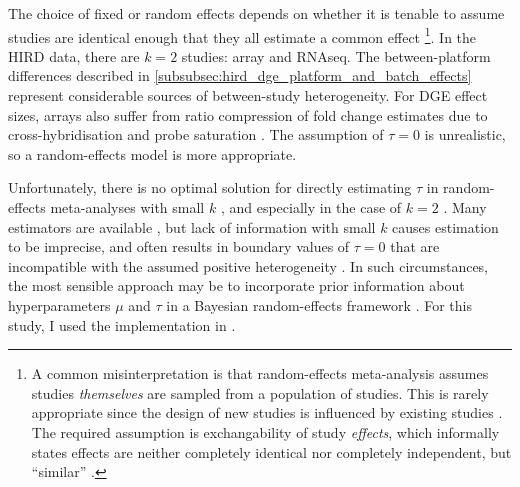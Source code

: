 The choice of fixed or random effects depends on whether it is tenable to assume studies are identical enough that they all estimate a common effect%
\footnote{
    A common misinterpretation is that random-effects meta-analysis assumes studies \emph{themselves} are sampled from a population of studies.
    This is rarely appropriate since the design of new studies is influenced by existing studies \autocite{higgins2009ReevaluationRandomeffectsMetaanalysis}.
    The required assumption is exchangability of study \emph{effects}, which informally states
    effects are neither completely identical nor completely independent, but \enquote{similar} \autocite{higgins2009ReevaluationRandomeffectsMetaanalysis}.
}.
In the \gls{HIRD} data, there are $k=2$ studies: array and \gls{RNAseq}.
The between-platform differences described in \cref{subsubsec:hird_dge_platform_and_batch_effects} represent considerable sources of between-study heterogeneity.
For \gls{DGE} effect sizes, arrays also suffer from ratio compression of fold change estimates due to cross-hybridisation and probe saturation \autocite{yuen2002AccuracyCalibrationCommercial,draghici2006ReliabilityReproducibilityIssues,ma2017JointBayesianModel}.
The assumption of $\tau=0$ is unrealistic, so a random-effects model is more appropriate.

Unfortunately, there is no optimal solution for directly estimating $\tau$ in random-effects meta-analyses with small $k$ \autocite{bender2018MethodsEvidenceSynthesis}, and especially in the case of $k=2$ \autocite{gonnermann2015NoSolutionCombining}.
Many estimators are available \autocite{veroniki2016MethodsEstimateBetweenstudy}, but lack of information with small $k$ causes estimation to be imprecise, and often results in boundary values of $\tau = 0$ that are incompatible with the assumed positive heterogeneity \autocite{chung2013NondegeneratePenalizedLikelihood,friede2017MetaanalysisFewSmall}.
In such circumstances, the most sensible approach may be to incorporate prior information about hyperparameters $\mu$ and $\tau$ in a Bayesian random-effects framework \autocite{chung2013NondegeneratePenalizedLikelihood,veroniki2016MethodsEstimateBetweenstudy,friede2017MetaanalysisFewSmall,seide2019LikelihoodbasedRandomeffectsMetaanalysis}.
For this study, I used the implementation in  \autocite{rover2017BayesianRandomeffectsMetaanalysis}.

